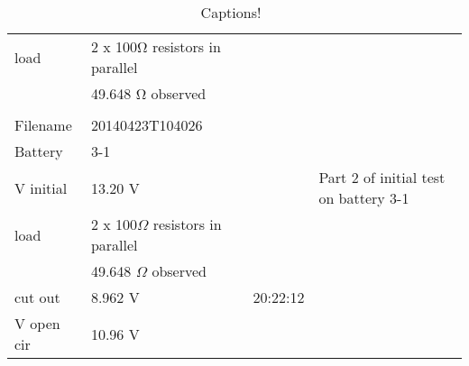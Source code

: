 \begin{table}[h]
\begin{tabular}{lllp{2.5cm}}
load       & 2 x 100Ω resistors in parallel &          &                                                                               \\
           & 49.648 Ω observed              &          &                                                                               \\
           &                                &          &                                                                               \\
\hline
Filename   & 20140423T104026                &          &                                                                               \\
Battery    & 3-1                            &          &                                                                               \\
V initial  & 13.20 V                        &          & Part 2 of initial test on battery 3-1                                         \\
load       & 2 x 100$\Omega$ resistors in parallel &          &                                                                               \\
           & 49.648 $\Omega$ observed              &          &                                                                               \\
cut out    & 8.962 V                        & 20:22:12 &                                                                               \\
V open cir & 10.96 V                        &          &                                                                              
\end{tabular}
\caption{Captions!~}
\end{table}